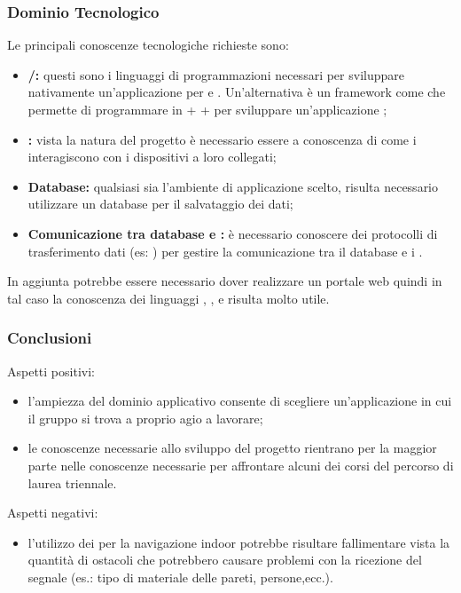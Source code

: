 \subsubsection{Dominio Tecnologico}
Le principali conoscenze tecnologiche richieste sono:

\begin{itemize}
	\item \textbf{/:} questi sono i linguaggi di programmazioni necessari per sviluppare nativamente un'applicazione per  e . Un'alternativa è un framework come  che 
	permette di programmare in  +  +  per sviluppare un'applicazione ;
	\item \textbf{:} vista la natura del progetto è necessario essere a conoscenza di come i  interagiscono con i dispositivi a loro collegati;
	\item \textbf{Database:} qualsiasi sia l'ambiente di applicazione scelto, risulta necessario utilizzare un database per il salvataggio dei dati;
	\item \textbf{Comunicazione tra database e :} è necessario conoscere dei protocolli di trasferimento dati (es: ) per gestire la comunicazione tra il database e i .
\end{itemize}

In aggiunta potrebbe essere necessario dover realizzare un portale web quindi in tal caso la conoscenza dei linguaggi , ,  e  risulta molto utile.


\subsubsection{Conclusioni}

Aspetti positivi:

\begin{itemize}
	\item l'ampiezza del dominio applicativo consente di scegliere un'applicazione in cui il gruppo si trova a proprio agio a lavorare;
	\item le conoscenze necessarie allo sviluppo del progetto rientrano per la maggior parte nelle conoscenze necessarie per affrontare alcuni dei corsi del percorso di laurea triennale.
\end{itemize}

Aspetti negativi:

\begin{itemize}
	\item l'utilizzo dei  per la navigazione indoor potrebbe risultare fallimentare vista la quantità di ostacoli che potrebbero causare problemi con la ricezione del segnale (es.: tipo di materiale delle pareti, persone,ecc.).
\end{itemize}